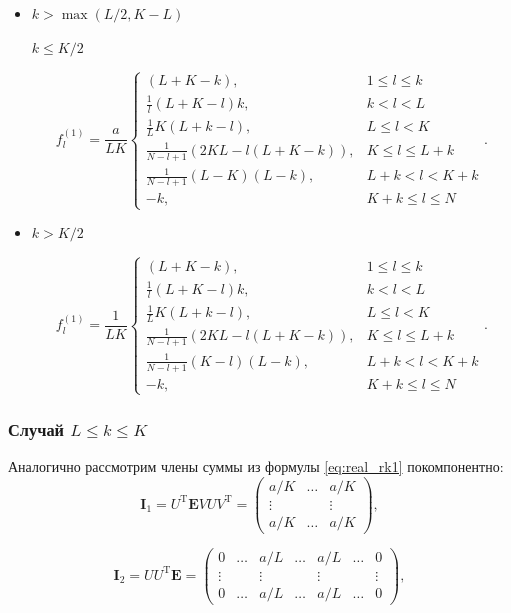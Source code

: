 \documentclass[specialist,
               substylefile = spbu.rtx,
               subf,href,colorlinks=true, 12pt]{disser}
\begin{document}
\begin{itemize}
\item
$k > \max(L / 2, K - L)$

$k \leq K/2$

$$f^{(1)}_l = \frac{a}{{LK}}
\begin{cases}
	(L + K - k), & \text{$1 \leq l \leq k$}\\
	\frac{1}{l}(L + K - l)k, & \text{$k < l < L$}\\
	\frac{1}{L}K(L + k - l), &\text{$L \leq l < K$}\\
	\frac{1}{N - l + 1}(2KL - l(L + K - k)), &\text{$K \leq l \leq L + k$}\\
	\frac{1}{N - l + 1}(L - K)(L - k), &\text{$L + k < l < K + k$}\\
	-k, &\text{$K + k \leq l \leq N$}
\end{cases}.
$$

\item
$k > K/2$


$$f^{(1)}_l = \frac{1}{{LK}}
\begin{cases}
	(L + K - k), & \text{$1 \leq l \leq k$}\\
	\frac{1}{l}(L + K - l)k, & \text{$k < l < L$}\\
	\frac{1}{L}K(L + k - l), &\text{$L \leq l < K$}\\
	\frac{1}{N - l + 1}(2KL - l(L + K - k)), &\text{$K \leq l \leq L + k$}\\
	\frac{1}{N - l + 1}(K - l)(L - k), &\text{$L + k < l < K + k$}\\
	-k, &\text{$K + k \leq l \leq N $}
\end{cases}.
$$
\end{itemize}

\subsubsection{Случай $L \leq k \leq K$}
Аналогично рассмотрим члены суммы из формулы \eqref{eq:real_rk1} покомпонентно:
$$\mathbf{I}_1 = U^{\mathrm{T}} \mathbf{E} V U V^{\mathrm{T}} = \begin{pmatrix}
	a/ K & \ldots &   a/ K\\
	\vdots & & \vdots\\
	a/ K &   \ldots &   a/ K
\end{pmatrix},$$

$$\mathbf{I}_2 = U U^{\mathrm{T}} \mathbf{E} = \begin{pmatrix}
	0 & \ldots & a/L & \ldots & a/L & \ldots & 0\\
	\vdots & & \vdots & & \vdots & & \vdots\\
	0 & \ldots & a/L & \ldots & a/L & \ldots & 0
\end{pmatrix},$$
\end{document}
